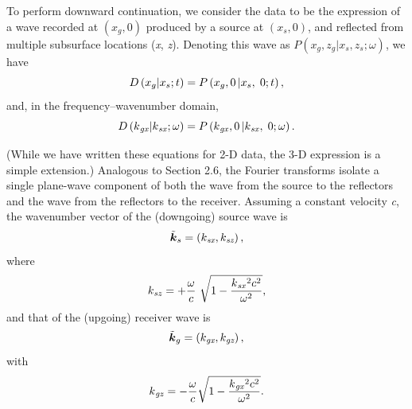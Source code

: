 To perform downward continuation, we consider the data to be the expression of a wave recorded at \(\left(x_g,0\right)\) produced by a source at
\(\left(x_s,0\right)\), and reflected from multiple subsurface locations (\textit{x}, \textit{z}). Denoting this wave as \(P\left(x_g,z_g|x_s,z_s;\omega
\right)\), we have
\begin{equation}
\text{\textit{$D$}}\left(\text{\textit{$x$}}_{\text{\textit{$g$}}}|\text{\textit{$x$}}_{\text{\textit{$s$}}};\text{\textit{$t$}}\right)=\text{\textit{$P$}}\left(\text{\textit{$x_g$}},0\left|\text{\textit{$x_s$}},\right.0;\text{\textit{$t$}}\right),\end{equation}
and, in the frequency--wavenumber domain,
\begin{equation}\text{\textit{$D$}}\left(\text{\textit{$k$}}_{\text{\textit{gx}}}|\text{\textit{$k$}}_{\text{\textit{sx}}};\omega \right)=\text{\textit{$P$}}\left(\text{\textit{$k$}}_{\text{\textit{gx}}},0\left|\text{\textit{$k$}}_{\text{\textit{sx}}},\right.0;\omega
\right).\end{equation}

(While we have written these equations for 2-D data, the 3-D expression is a simple extension.) Analogous to Section 2.6,
the Fourier transforms isolate a single plane-wave component of both the wave from the source to the reflectors and the wave from the reflectors
to the receiver. Assuming a constant velocity \textit{c}, the wavenumber vector of the (downgoing) source wave is
\begin{equation}\tilde{\boldsymbol{k}}_s =\left(\text{\textit{$k_{\text{sx}}$}},\text{\textit{$k_{\text{sz}}$}}\right),\end{equation}
where
\begin{equation}\text{\textit{$k$}}_{\text{\textit{sz}}}=+\frac{\omega }{\text{\textit{$c$}}}\text{  }\sqrt{1-\frac{\text{\textit{$k$}}_{\text{\textit{sx}}}{}^2\text{\textit{$c$}}^2}{\omega
^2}},\end{equation}
and that of the (upgoing) receiver wave is
\begin{equation}\tilde{\boldsymbol{k}}_g =\left(\text{\textit{$k_{\text{gx}}$}},\text{\textit{$k_{\text{gz}}$}}\right),\end{equation}
with
\begin{equation}\text{\textit{$k$}}_{\text{\textit{gz}}}=- \frac{\omega }{\text{\textit{$c$}}} \sqrt{1-\frac{\text{\textit{$k$}}_{\text{\textit{gx}}}{}^2\text{\textit{$c$}}^2}{\omega
^2}}.\end{equation}


